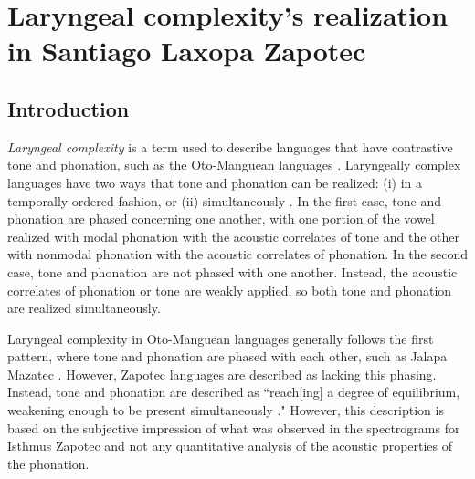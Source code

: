 \chapter{Laryngeal complexity's realization in Santiago Laxopa Zapotec} \label{ch:testing_lc}

\section{Introduction}\label{sec:introduction_of_lc}
\textit{Laryngeal complexity} is a term used to describe languages that have contrastive tone and phonation, such as the Oto-Manguean languages \citep{blankenshipTimeCourseBreathiness1997,blankenshipTimingNonmodalPhonation2002,silvermanLaryngealComplexityOtomanguean1997,silvermanPhasingRecoverability1997}. Laryngeally complex languages have two ways that tone and phonation can be realized: (i) in a temporally ordered fashion, or (ii) simultaneously \citep{silvermanLaryngealComplexityOtomanguean1997}. In the first case, tone and phonation are phased concerning one another, with one portion of the vowel realized with modal phonation with the acoustic correlates of tone and the other with nonmodal phonation with the acoustic correlates of phonation. In the second case, tone and phonation are not phased with one another. Instead, the acoustic correlates of phonation or tone are weakly applied, so both tone and phonation are realized simultaneously.

Laryngeal complexity in Oto-Manguean languages generally follows the first pattern, where tone and phonation are phased with each other, such as Jalapa Mazatec \citep{blankenshipTimeCourseBreathiness1997,blankenshipTimingNonmodalPhonation2002,silvermanLaryngealComplexityOtomanguean1997,silvermanPhasingRecoverability1997}. However, Zapotec languages are described as lacking this phasing. Instead, tone and phonation are described as ``reach[ing] a degree of equilibrium, weakening enough to be present simultaneously \citep[558]{herrerazendejasAmuzgoZapotecTwo2000}." However, this description is based on the subjective impression of what was observed in the spectrograms for Isthmus Zapotec and not any quantitative analysis of the acoustic properties of the phonation.  

